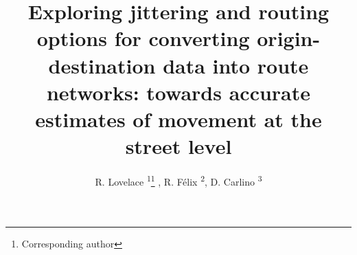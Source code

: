 \documentclass{isprs} %
\begin{document}
\title{Exploring jittering and routing options for converting origin-destination data into route networks: towards accurate estimates of movement at the street level}
\date{}


\author{
R. Lovelace \textsuperscript{1}\thanks{Corresponding author}
, R. Félix \textsuperscript{2}, 
D. Carlino \textsuperscript{3}
}

\address{
\textsuperscript{1} Institute for Transport Studies, University of Leeds, UK - r.lovelace@leeds.ac.uk \\
\textsuperscript{2} CERIS, Instituto Superior Técnico, University of Lisbon, Portugal - rosamfelix@tecnico.ulisboa.pt \\
\textsuperscript{3} Alan Turing Institute, UK - dcarlino@turing.ac.uk
}



\icwg{}   %
\end{document}
